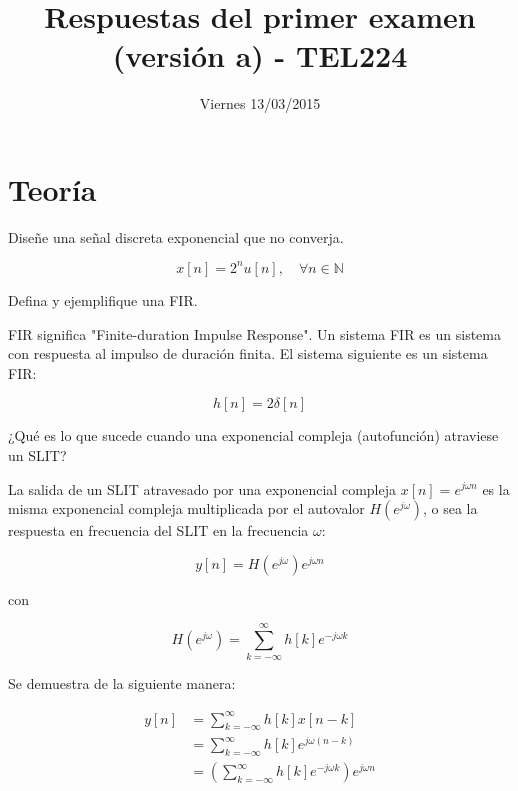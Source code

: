\documentclass[addpoints,answers]{exam}
\begin{document}
\headrule

\title{Respuestas del primer examen (versión a) - TEL224}
\date{Viernes 13/03/2015}
\maketitle

\section*{Teoría}

\begin{questions}
\question[5]
Diseñe una señal discreta exponencial que no converja.

\begin{solution}
$$x[n] = 2^n u[n],\quad \forall n \in \mathbb{N}$$
\end{solution}

\question[5]
Defina y ejemplifique una FIR.

\begin{solution}
FIR significa "Finite-duration Impulse Response". Un sistema FIR es un sistema con respuesta al impulso de duración finita. El sistema siguiente es un sistema FIR:

$$h[n] = 2\delta[n]$$
\end{solution}

\question[5]
¿Qué es lo que sucede cuando una exponencial compleja (autofunción) atraviese un SLIT?

\begin{solution}
La salida de un SLIT atravesado por una exponencial compleja \(x[n] = e^{j\omega n}\) es la misma exponencial compleja multiplicada por el autovalor \(H\left(e^{j\omega}\right)\), o sea la respuesta en frecuencia del SLIT en la frecuencia \(\omega\):

$$
y[n] = H\left(e^{j\omega}\right) e^{j\omega n}
$$

con

$$
H\left(e^{j\omega}\right) = \sum_{k=-\infty}^{\infty} h[k] e^{-j\omega k}
$$

Se demuestra de la siguiente manera:

\[
\begin{array}{ll}
y[n] &= \sum_{k=-\infty}^{\infty} h[k] x[n-k] \\
&= \sum_{k=-\infty}^{\infty} h[k] e^{j\omega(n-k)} \\
&= \left( \sum_{k=-\infty}^{\infty} h[k] e^{-j\omega k} \right) e^{j\omega n}\\
\end{array}
\]


\end{solution}
\end{questions}
\end{document}
